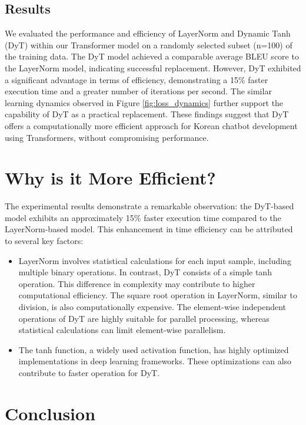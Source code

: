 \documentclass{article}
\begin{document}
\subsection{Results}
We evaluated the performance and efficiency of LayerNorm and Dynamic Tanh (DyT) within our Transformer model on a randomly selected subset (n=100) of the training data. The DyT model achieved a comparable average BLEU score to the LayerNorm model, indicating successful replacement. However, DyT exhibited a significant advantage in terms of efficiency, demonstrating a 15\% faster execution time and a greater number of iterations per second. The similar learning dynamics observed in Figure \ref{fig:loss_dynamics} further support the capability of DyT as a practical replacement. These findings suggest that DyT offers a computationally more efficient approach for Korean chatbot development using Transformers, without compromising performance.

\section{Why is it More Efficient?}

The experimental results demonstrate a remarkable observation: the DyT-based model exhibits an approximately 15\% faster execution time compared to the LayerNorm-based model. This enhancement in time efficiency can be attributed to several key factors:

\begin{itemize}
    \item LayerNorm involves statistical calculations for each input sample, including multiple binary operations. In contrast, DyT consists of a simple tanh operation. This difference in complexity may contribute to higher computational efficiency. The square root operation in LayerNorm, similar to division, is also computationally expensive. The element-wise independent operations of DyT are highly suitable for parallel processing, whereas statistical calculations can limit element-wise parallelism.
    \item The tanh function, a widely used activation function, has highly optimized implementations in deep learning frameworks. These optimizations can also contribute to faster operation for DyT.
\end{itemize}

\section{Conclusion}
\end{document}

